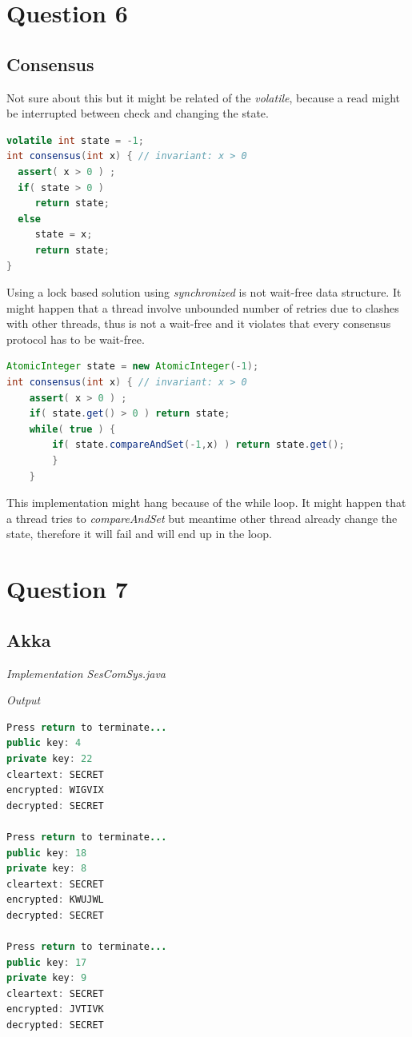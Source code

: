 \documentclass[format=acmsmall, review=false, screen=true]{acmart}
\begin{document}
\section{Question 6}

\subsection{Consensus}

Not sure about this but it might be related of the \textit{volatile}, because a read might be interrupted between check and changing the state. 

\begin{lstlisting}[language=java]
volatile int state = -1;
int consensus(int x) { // invariant: x > 0
  assert( x > 0 ) ;
  if( state > 0 )
     return state;
  else
	 state = x;
     return state;
}
\end{lstlisting}

Using a lock based solution using \textit{synchronized} is not wait-free data structure. It might happen that a thread involve unbounded number of retries due to clashes with other threads, thus is not a wait-free and it violates that every consensus protocol has to be wait-free.

\begin{lstlisting}[language=java]
AtomicInteger state = new AtomicInteger(-1);
int consensus(int x) { // invariant: x > 0
    assert( x > 0 ) ;
    if( state.get() > 0 ) return state;
    while( true ) {
        if( state.compareAndSet(-1,x) ) return state.get();
        }   
    }
\end{lstlisting}

This implementation might hang because of the while loop. It might happen that a thread
tries to \textit{compareAndSet} but meantime other thread already change the state, therefore it will fail and will end up in the loop.

\section{Question 7}

\subsection{Akka}

\textit{Implementation SesComSys.java}

\textit{Output}

\begin{lstlisting}[language=java]
Press return to terminate...
public key: 4
private key: 22
cleartext: SECRET
encrypted: WIGVIX
decrypted: SECRET

Press return to terminate...
public key: 18
private key: 8
cleartext: SECRET
encrypted: KWUJWL
decrypted: SECRET

Press return to terminate...
public key: 17
private key: 9
cleartext: SECRET
encrypted: JVTIVK
decrypted: SECRET
\end{lstlisting}
\end{document}

